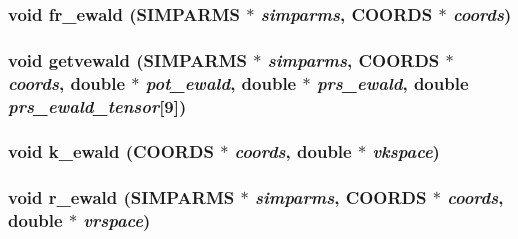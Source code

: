 \subsubsection{\setlength{\rightskip}{0pt plus 5cm}void fr\_\-ewald ({\bf SIMPARMS} $\ast$ {\em simparms}, {\bf COORDS} $\ast$ {\em coords})}\label{md__ewald_8c_3d9d66102236af5f5828f6926ee3cfc2}


\subsubsection{\setlength{\rightskip}{0pt plus 5cm}void getvewald ({\bf SIMPARMS} $\ast$ {\em simparms}, {\bf COORDS} $\ast$ {\em coords}, double $\ast$ {\em pot\_\-ewald}, double $\ast$ {\em prs\_\-ewald}, double {\em prs\_\-ewald\_\-tensor}[9])}\label{md__ewald_8c_b354e8feea8f66cb0d1dc44c6feca732}


\subsubsection{\setlength{\rightskip}{0pt plus 5cm}void k\_\-ewald ({\bf COORDS} $\ast$ {\em coords}, double $\ast$ {\em vkspace})}\label{md__ewald_8c_c35c2fd59a5f16e85be95d6ee393e3b1}


\subsubsection{\setlength{\rightskip}{0pt plus 5cm}void r\_\-ewald ({\bf SIMPARMS} $\ast$ {\em simparms}, {\bf COORDS} $\ast$ {\em coords}, double $\ast$ {\em vrspace})}\label{md__ewald_8c_8d4848117c2a668a8f548acd8e2fd30b}


